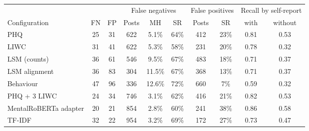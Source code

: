 \begin{tabular}{lccccccccc}
\toprule
& & & \multicolumn{3}{c}{False negatives} & \multicolumn{2}{c}{False positives} & \multicolumn{2}{c}{Recall by self-report} \\
\cmidrule(lr){4-6}\cmidrule(lr){7-8}\cmidrule(lr){9-10}
Configuration & FN & FP & Posts & MH & SR & Posts & SR & with & without \\
\midrule
PHQ & 25 & 31 & 622 & 5.1\% & 64\% & 412 & 23\% & 0.81 & 0.53 \\
LIWC & 31 & 41 & 622 & 5.3\% & 58\% & 231 & 20\% & 0.78 & 0.32 \\
LSM (counts) & 36 & 61 & 546 & 9.5\% & 67\% & 483 & 18\% & 0.71 & 0.37 \\
LSM alignment & 36 & 83 & 304 & 11.5\% & 67\% & 368 & 13\% & 0.71 & 0.37 \\
Behaviour & 47 & 96 & 336 & 12.6\% & 72\% & 660 & 7\% & 0.59 & 0.32 \\
PHQ + 3 LIWC & 24 & 34 & 746 & 3.1\% & 62\% & 416 & 21\% & 0.82 & 0.53 \\
MentalRoBERTa adapter & 20 & 21 & 854 & 2.8\% & 60\% & 241 & 38\% & 0.86 & 0.58 \\
TF-IDF & 32 & 22 & 954 & 3.2\% & 69\% & 172 & 27\% & 0.73 & 0.47 \\
\bottomrule
\end{tabular}
